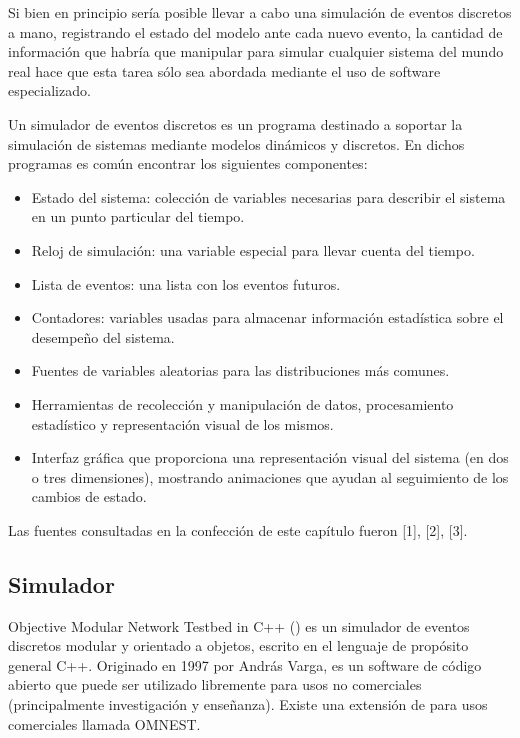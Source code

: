 \documentclass[]{article}
\begin{document}
Si bien en principio sería posible llevar a cabo una simulación de eventos
discretos a mano, registrando el estado del modelo ante cada nuevo evento, la
cantidad de información que habría que manipular para simular cualquier sistema
del mundo real hace que esta tarea sólo sea abordada mediante el uso de
software especializado.

Un simulador de eventos discretos es un programa destinado a soportar la
simulación de sistemas mediante modelos dinámicos y discretos. En dichos
programas es común encontrar los siguientes componentes:

\begin{itemize}
    \item Estado del sistema: colección de variables necesarias para describir
el sistema en un punto particular del tiempo.

    \item Reloj de simulación: una variable especial para llevar cuenta del
tiempo.

    \item Lista de eventos: una lista con los eventos futuros.

    \item Contadores: variables usadas para almacenar información estadística
sobre el desempeño del sistema.

    \item Fuentes de variables aleatorias para las distribuciones más comunes.

    \item Herramientas de recolección y manipulación de datos, procesamiento
estadístico y representación visual de los mismos.

    \item Interfaz gráfica que proporciona una representación visual del
sistema (en dos o tres dimensiones), mostrando animaciones que ayudan al
seguimiento de los cambios de estado.
\end{itemize}

Las fuentes consultadas en la confección de este capítulo fueron [1], [2], [3].

\subsection{Simulador \omnetpp{}}

Objective Modular Network Testbed in C++ (\omnetpp{}) es un simulador de eventos
discretos modular y orientado a objetos, escrito en el lenguaje de propósito
general C++. Originado en 1997 por András Varga, es un software de código
abierto que puede ser utilizado libremente para usos no comerciales
(principalmente investigación y enseñanza). Existe una extensión de \omnetpp{}
para usos comerciales llamada OMNEST.
\end{document}
